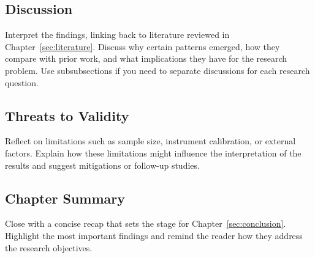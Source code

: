 \subsection{Discussion}
Interpret the findings, linking back to literature reviewed in
Chapter~\ref{sec:literature}. Discuss why certain patterns emerged, how they
compare with prior work, and what implications they have for the research
problem. Use subsubsections if you need to separate discussions for each
research question.

\subsection{Threats to Validity}
Reflect on limitations such as sample size, instrument calibration, or external
factors. Explain how these limitations might influence the interpretation of
the results and suggest mitigations or follow-up studies.

\subsection{Chapter Summary}
Close with a concise recap that sets the stage for
Chapter~\ref{sec:conclusion}. Highlight the most important findings and remind
the reader how they address the research objectives.
